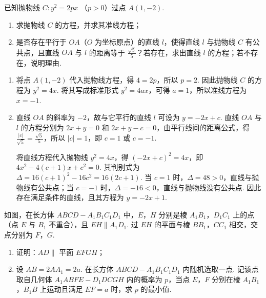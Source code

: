 \begin{problem}
已知抛物线 \(C: y^{2}=2px\) （\(p>0\)）过点 \(A\left(1,-2\right)\).

\begin{enumerate}
\item 求抛物线 \(C\) 的方程，并求其准线方程；
\item 是否存在平行于 \(OA\)（\(O\) 为坐标原点）的直线 \(l\)，使得直线 \(l\) 与抛物线 \(C\) 有公共点，且直线 \(OA\) 与 \(l\) 的距离等于 \(\frac{\sqrt{5}}{5}\)？若存在，求出直线 \(l\) 的方程；若不存在，说明理由.
\end{enumerate}
\end{problem}

\begin{solution}
\begin{enumerate}
\item 将点 \(A\left(1,-2\right)\) 代入抛物线方程，得 \(4=2p\)，所以 \(p=2\). 因此抛物线 \(C\) 的方程为 \(y^2=4x\). 将其写成标准形式 \(y^2=4ax\)，可得 \(a=1\)，所以准线方程为 \(x=-1\).
\item 直线 \(OA\) 的斜率为 \(-2\)，故与它平行的直线 \(l\) 可设为 \(y=-2x+c\). 直线 \(OA\) 与 \(l\) 的方程分别为 \(2x+y=0\) 和 \(2x+y-c=0\)，由平行线间的距离公式，得 \(\frac{|c|}{\sqrt{5}}=\frac{\sqrt{5}}{5}\)，所以 \(|c|=1\)，即 \(c=1\) 或 \(c=-1\).

将直线方程代入抛物线 \(y^2=4x\)，得 \(\left(-2x+c\right)^2=4x\)，即 \(4x^2-4(c+1)x+c^2=0\). 其判别式为 \(\Delta=16(c+1)^2-16c^2=16(2c+1)\). 当 \(c=1\) 时，\(\Delta=48>0\)，直线与抛物线有公共点；当 \(c=-1\) 时，\(\Delta=-16<0\)，直线与抛物线没有公共点. 因此存在满足条件的直线，且其方程为 \(y=-2x+1\).
\end{enumerate}
\end{solution}

\begin{problem}
如图，在长方体 \(ABCD-A_{1}B_{1}C_{1}D_{1}\) 中，\(E\)，\(H\) 分别是棱 \(A_{1}B_{1}\)，\(D_{1}C_{1}\) 上的点（点 \(E\) 与 \(B_{1}\) 不重合），且 \(EH\parallel A_{1}D_{1}\). 过 \(EH\) 的平面与棱 \(BB_{1}\)，\(CC_{1}\) 相交，交点分别为 \(F\)，\(G\).

\begin{enumerate}
\item 证明：\(AD\parallel\) 平面 \(EFGH\)；
\item 设 \(AB = 2AA_{1} = 2a\). 在长方体 \(ABCD-A_{1}B_{1}C_{1}D_{1}\) 内随机选取一点. 记该点取自几何体 \(A_{1}ABFE-D_{1}DCGH\) 内的概率为 \(p\)，当点 \(E\)，\(F\) 分别在棱 \(A_{1}B_{1}\)，\(B_{1}B\) 上运动且满足 \(EF = a\) 时，求 \(p\) 的最小值.
\end{enumerate}

\end{problem}

